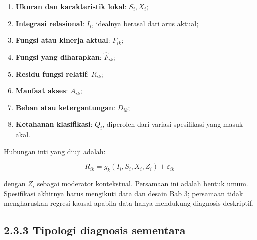 \documentclass[
  indonesian,
  11pt,
  a4paper,
  oneside,
  openany]{report}
\providecommand{\tightlist}{%
  \setlength{\itemsep}{0pt}\setlength{\parskip}{0pt}}
\begin{document}
\begin{enumerate}
\def\labelenumi{\arabic{enumi}.}
\tightlist
\item
  \textbf{Ukuran dan karakteristik lokal}: \(S_i, X_i\);
\item
  \textbf{Integrasi relasional}: \(I_i\), idealnya berasal dari arus
  aktual;
\item
  \textbf{Fungsi atau kinerja aktual}: \(F_{ik}\);
\item
  \textbf{Fungsi yang diharapkan}: \(\widehat{F}_{ik}\);
\item
  \textbf{Residu fungsi relatif}: \(R_{ik}\);
\item
  \textbf{Manfaat akses}: \(A_{ik}\);
\item
  \textbf{Beban atau ketergantungan}: \(D_{ik}\);
\item
  \textbf{Ketahanan klasifikasi}: \(Q_i\), diperoleh dari variasi
  spesifikasi yang masuk akal.
\end{enumerate}

Hubungan inti yang diuji adalah:

\[
R_{ik}=g_k(I_i,S_i,X_i,Z_i)+\varepsilon_{ik}
\]

dengan \(Z_i\) sebagai moderator kontekstual. Persamaan ini adalah
bentuk umum. Spesifikasi akhirnya harus mengikuti data dan desain Bab 3;
persamaan tidak mengharuskan regresi kausal apabila data hanya mendukung
diagnosis deskriptif.

\subsection{2.3.3 Tipologi diagnosis
sementara}\label{tipologi-diagnosis-sementara}
\end{document}
